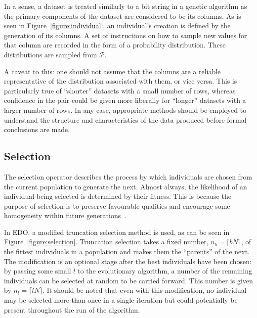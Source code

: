 
In a sense, a dataset is treated similarly to a bit string in a genetic
algorithm as the primary components of the dataset are considered to be its
columns. As is seen in Figure~\ref{figure:individual}, an individual's creation
is defined by the generation of its columns. A set of instructions on how to
sample new values for that column are recorded in the form of a probability
distribution. These distributions are sampled from \(\mathcal{P}\).

A caveat to this: one should not assume that the columns are a reliable
representative of the distribution associated with them, or vice versa. This is
particularly true of ``shorter'' datasets with a small number of rows, whereas
confidence in the pair could be given more liberally for ``longer'' datasets
with a larger number of rows. In any case, appropriate methods should be
employed to understand the structure and characteristics of the data produced
before formal conclusions are made.



\subsection{Selection}

The selection operator describes the process by which individuals are chosen
from the current population to generate the next. Almost always, the likelihood
of an individual being selected is determined by their fitness. This is because
the purpose of selection is to preserve favourable qualities and encourage some
homogeneity within future generations~\cite{Back1994}.



In EDO, a modified truncation selection method is used, as can be seen in
Figure~\ref{figure:selection}. Truncation selection takes a fixed number, \(n_b
= \lceil bN\rceil\), of the fittest individuals in a population and makes them
the ``parents'' of the next. The modification is an optional stage after the
best individuals have been chosen: by passing some small \(l\) to the
evolutionary algorithm, a number of the remaining individuals can be selected at
random to be carried forward. This number is given by \(n_l = \lceil lN
\rceil\). It should be noted that even with this modification, no individual may
be selected more than once in a single iteration but could potentially be
present throughout the run of the algorithm.


